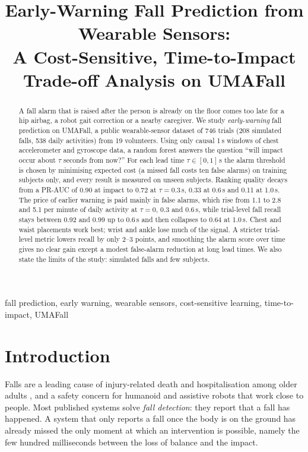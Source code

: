 \documentclass[conference]{IEEEtran}
\begin{document}
\title{Early-Warning Fall Prediction from Wearable Sensors:\\
A Cost-Sensitive, Time-to-Impact Trade-off Analysis on UMAFall}

\author{
}

\maketitle

\begin{abstract}
A fall alarm that is raised after the person is already on the floor comes too late for a hip airbag, a robot gait correction or a nearby caregiver. We study \emph{early-warning} fall prediction on UMAFall, a public wearable-sensor dataset of 746 trials (208 simulated falls, 538 daily activities) from 19 volunteers. Using only causal 1\,s windows of chest accelerometer and gyroscope data, a random forest answers the question ``will impact occur about $\tau$ seconds from now?'' For each lead time $\tau\in[0,1]$\,s the alarm threshold is chosen by minimising expected cost (a missed fall costs ten false alarms) on training subjects only, and every result is measured on unseen subjects. Ranking quality decays from a PR-AUC of 0.90 at impact to 0.72 at $\tau=0.3$\,s, 0.33 at 0.6\,s and 0.11 at 1.0\,s. The price of earlier warning is paid mainly in false alarms, which rise from 1.1 to 2.8 and 5.1 per minute of daily activity at $\tau=0$, 0.3 and 0.6\,s, while trial-level fall recall stays between 0.92 and 0.99 up to 0.6\,s and then collapses to 0.64 at 1.0\,s. Chest and waist placements work best; wrist and ankle lose much of the signal. A stricter trial-level metric lowers recall by only 2--3 points, and smoothing the alarm score over time gives no clear gain except a modest false-alarm reduction at long lead times. We also state the limits of the study: simulated falls and few subjects.
\end{abstract}

\begin{IEEEkeywords}
fall prediction, early warning, wearable sensors, cost-sensitive learning, time-to-impact, UMAFall
\end{IEEEkeywords}

\section{Introduction}
Falls are a leading cause of injury-related death and hospitalisation among older adults \cite{noury2007,igual2013}, and a safety concern for humanoid and assistive robots that work close to people. Most published systems solve \emph{fall detection}: they report that a fall has happened. A system that only reports a fall once the body is on the ground has already missed the only moment at which an intervention is possible, namely the few hundred milliseconds between the loss of balance and the impact.
\end{document}
